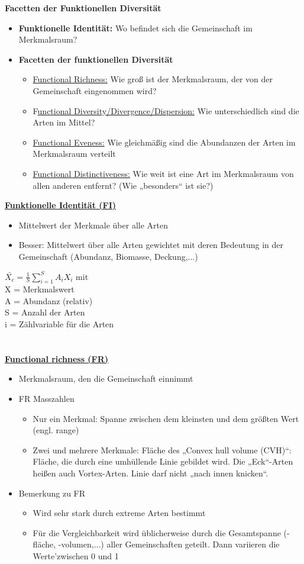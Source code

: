 \textbf{Facetten der Funktionellen Diversität}
\begin{itemize}
	\item \textbf{Funktionelle Identität:} Wo befindet sich die Gemeinschaft im Merkmalsraum?
	\item \textbf{Facetten der funktionellen Diversität}
	\begin{itemize}
		\item \underline{Functional Richness:} Wie groß ist der Merkmalsraum, der von der Gemeinschaft eingenommen wird?
		\item F\underline{unctional Diversity/Divergence/Dispersion:} Wie unterschiedlich sind die Arten im Mittel?
		\item \underline{Functional Eveness:} Wie gleichmäßig sind die Abundanzen der Arten im Merkmalsraum verteilt
		\item \underline{Functional Distinctiveness:} Wie weit ist eine Art im Merkmalsraum von allen anderen entfernt? (Wie „besonders“ ist sie?)
	\end{itemize}
\end{itemize}

\underline{\textbf{Funktionelle Identität (FI)}}
\begin{itemize}
	\item Mittelwert der Merkmale über alle Arten
	\item Besser: Mittelwert über alle Arten gewichtet mit deren Bedeutung in der Gemeinschaft (Abundanz, Biomasse, Deckung,...)
\end{itemize}

$\bar{X_c}=\displaystyle \frac{1}{S} \sum_{i=1}^{S}A_i X_i$ mit\\
X = Merkmalswert\\
A = Abundanz (relativ)\\
S = Anzahl der Arten\\
i = Zählvariable für die Arten\\
\\\\
\underline{\textbf{Functional richness (FR)}}\\
\begin{itemize}
	\item Merkmalsraum, den die Gemeinschaft einnimmt
	\item FR Masszahlen
	\begin{itemize}
		\item Nur ein Merkmal: Spanne zwischen dem kleinsten und dem größten Wert (engl. range)
		\item Zwei und mehrere Merkmale: Fläche des „Convex hull volume (CVH)“: Fläche, die durch eine umhüllende Linie gebildet wird. Die „Eck“-Arten heißen auch Vortex-Arten. Linie darf nicht „nach innen knicken“.
	\end{itemize}
	\item Bemerkung zu FR
	\begin{itemize}
		\item Wird sehr stark durch extreme Arten bestimmt
		\item Für die Vergleichbarkeit wird üblicherweise durch die Gesamtspanne (-fläche, -volumen,...) aller Gemeinschaften geteilt. Dann variieren die Werte'zwischen 0 und 1
	\end{itemize}
\end{itemize}